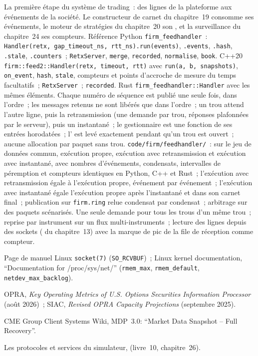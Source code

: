 \begin{build}
 La première étape du système de trading~: des lignes de la plateforme aux événements de la société. Le constructeur de carnet du
chapitre~19 consomme ses événements, le moteur de stratégies du chapitre~20 son , et la surveillance du chapitre~24 ses
compteurs.
 Référence Python \texttt{firm\_feedhandler}~: \texttt{Handler(retx, gap\_timeout\_ns, rtt\_ns).run(events)},
\texttt{.events}, \texttt{.hash}, \texttt{.stale}, \texttt{.counters}~; \texttt{RetxServer}, \texttt{merge}, \texttt{recorded},
\texttt{normalise}, \texttt{book}. C++20 \texttt{firm::feed2::Handler(retx, timeout, rtt)} avec \texttt{run(a, b, snapshots)},
\texttt{on\_event}, \texttt{hash}, \texttt{stale}, compteurs et points d'accroche de mesure du temps facultatifs~; \texttt{RetxServer}~; \texttt{recorded}.
Rust \texttt{firm\_feedhandler::Handler} avec les mêmes éléments.
 Chaque numéro de séquence est publié une seule fois, dans l'ordre~; les messages retenus ne sont libérés que dans l'ordre~; un trou attend l'autre
ligne, puis la retransmission (une demande par trou, réponses plafonnées par le serveur), puis un instantané~; le gestionnaire est
une fonction de ses entrées horodatées~; l' est levé exactement pendant qu'un trou est ouvert~; aucune allocation par paquet sans
trou.
 \texttt{code/firm/feedhandler/}~: sur le jeu de données commun, exécution propre, exécution avec retransmission et exécution avec instantané, avec
nombres d'événements, condensats, intervalles de péremption et compteurs identiques en Python, C++ et Rust~; l'exécution avec retransmission égale à
l'exécution propre, événement par événement~; l'exécution avec instantané égale l'exécution propre après l'instantané et dans son carnet final~; publication sur
\texttt{firm.ring} relue condensat par condensat~; arbitrage sur des paquets scénarisés.
 Une seule demande pour tous les trous d'un même trou~; reprise par instrument sur un flux multi-instruments~; lecture des lignes
depuis des sockets ( du chapitre~13) avec la marque de pic de la file de réception comme compteur.
\end{build}

\begin{omsources}
\item Page de manuel Linux \texttt{socket(7)} (\texttt{SO\_RCVBUF})~; Linux kernel documentation, ``Documentation for
/proc/sys/net/'' (\texttt{rmem\_max}, \texttt{rmem\_default}, \texttt{netdev\_max\_backlog}).
\item OPRA, \emph{Key Operating Metrics of U.S. Options Securities Information Processor} (août 2026)~; SIAC, \emph{Revised
OPRA Capacity Projections} (septembre 2025).
\item CME Group Client Systems Wiki, MDP~3.0: ``Market Data Snapshot -- Full Recovery''.
\item Les protocoles et services du simulateur,  (livre~10, chapitre~26).
\end{omsources}

